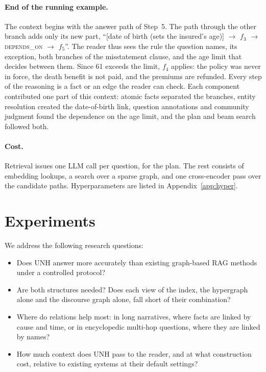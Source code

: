 \documentclass[sigconf, review, anonymous]{acmart}
\newcommand{\sys}{UNH}
\newcommand{\rel}[1]{\textsc{#1}}            %
\begin{document}
\paragraph{\textbf{End of the running example.}}
The context begins with the answer path of Step~5. The path through the other branch adds only its new part, ``[date of birth (sets the insured's age)] $\to$ $f_3$ $\to$ \rel{depends\_on} $\to$ $f_5$''. The reader thus sees the rule the question names, its exception, both branches of the misstatement clause, and the age limit that decides between them. Since 61 exceeds the limit, $f_4$ applies: the policy was never in force, the death benefit is not paid, and the premiums are refunded. Every step of the reasoning is a fact or an edge the reader can check. Each component contributed one part of this context: atomic facts separated the branches, entity resolution created the date-of-birth link, question annotations and community judgment found the dependence on the age limit, and the plan and beam search followed both.

\paragraph{\textbf{Cost.}}
Retrieval issues one LLM call per question, for the plan. The rest consists of embedding lookups, a search over a sparse graph, and one cross-encoder pass over the candidate paths. Hyperparameters are listed in Appendix~\ref{app:hyper}.


\section{Experiments}
\label{sec:experiments}

We address the following research questions:
\begin{itemize}
    \item[\textbf{RQ1}] Does \sys{} answer more accurately than existing graph-based RAG methods under a controlled protocol?
    \item[\textbf{RQ2}] Are both structures needed? Does each view of the index, the hypergraph alone and the discourse graph alone, fall short of their combination?
    \item[\textbf{RQ3}] Where do relations help most: in long narratives, where facts are linked by cause and time, or in encyclopedic multi-hop questions, where they are linked by names?
    \item[\textbf{RQ4}] How much context does \sys{} pass to the reader, and at what construction cost, relative to existing systems at their default settings?
\end{itemize}
\end{document}
